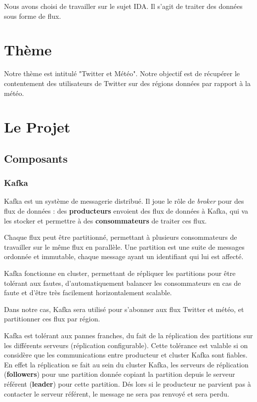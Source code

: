 \documentclass[a4paper,oneside,10pt]{article}
\begin{document}
Nous avons choisi de travailler sur le sujet IDA. Il s'agit de traiter des données sous forme de flux. \\

\section{Thème} 

Notre thème est intitulé "Twitter et Météo". Notre objectif est de récupérer le contentement des utilisateurs de Twitter sur des régions données par rapport à la météo. 

\section{Le Projet}

\subsection{Composants}

\subsubsection{Kafka}

Kafka est un système de messagerie distribué. Il joue le r\^ole de \textit{broker} pour des flux de données : des \textbf{producteurs} envoient des flux de données à Kafka, qui va les stocker et permettre à des \textbf{consommateurs} de traiter ces flux.

Chaque flux peut \^etre partitionné, permettant à plusieurs consommateurs de travailler sur le m\^eme flux en parallèle. Une partition est une suite de messages ordonnée et immutable, chaque message ayant un identifiant qui lui est affecté.

Kafka fonctionne en cluster, permettant de répliquer les partitions pour être tolérant aux fautes, d'automatiquement balancer les consommateurs en cas de faute et d'être très facilement horizontalement scalable.

Dans notre cas, Kafka sera utilisé pour s'abonner aux flux Twitter et météo, et partitionner ces flux par région.

Kafka est tolérant aux pannes franches, du fait de la réplication des partitions sur les différents serveurs (réplication configurable). Cette tolérance est valable si on considère que les communications entre producteur et cluster Kafka sont fiables. En effet la réplication se fait au sein du cluster Kafka, les serveurs de réplication (\textbf{followers}) pour une partition donnée copiant la partition depuis le serveur référent (\textbf{leader}) pour cette partition. Dés lors si le producteur ne parvient pas à contacter le serveur référent, le message ne sera pas renvoyé et sera perdu. 
\end{document}
